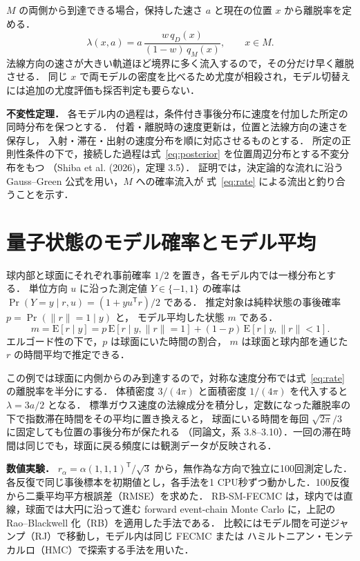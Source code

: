\documentclass[leqno,a4j]{jarticle}
\numberwithin{equation}{section}
\begin{document}
$M$ の両側から到達できる場合，保持した速さ $a$ と現在の位置 $x$ から離脱率を定める．
\begin{equation}
 \lambda(x,a)=a\,\frac{w\,q_D(x)}{(1-w)\,q_M(x)},\qquad x\in M .
 \label{eq:rate}
\end{equation}
法線方向の速さが大きい軌道ほど境界に多く流入するので，その分だけ早く離脱させる．
同じ $x$ で両モデルの密度を比べるため尤度が相殺され，モデル切替えには追加の尤度評価も採否判定も要らない．

\textbf{不変性定理．}
各モデル内の過程は，条件付き事後分布に速度を付加した所定の同時分布を保つとする．
付着・離脱時の速度更新は，位置と法線方向の速さを保存し，
入射・滞在・出射の速度分布を順に対応させるものとする．
所定の正則性条件の下で，接続した過程は式~\eqref{eq:posterior} を位置周辺分布とする不変分布をもつ
（Shiba et al. (2026)，定理 3.5）．
証明では，決定論的な流れに沿う Gauss--Green 公式を用い，$M$ への確率流入が
式~\eqref{eq:rate} による流出と釣り合うことを示す．

\newpage
\section{量子状態のモデル確率とモデル平均}
球内部と球面にそれぞれ事前確率 $1/2$ を置き，各モデル内では一様分布とする．
単位方向 $u$ に沿った測定値 $Y\in\{-1,1\}$ の確率は
$\Pr(Y=y\mid r,u)=(1+yu^{\mathsf T}r)/2$ である．
推定対象は純粋状態の事後確率 $p=\Pr(\|r\|=1\mid y)$ と，
モデル平均した状態 $m$ である．
\begin{equation}
 m=\mathrm{E}[r\mid y]
   =p\,\mathrm{E}[r\mid y,\|r\|=1]
   +(1-p)\,\mathrm{E}[r\mid y,\|r\|<1] .
 \label{eq:bma}
\end{equation}
エルゴード性の下で，$p$ は球面にいた時間の割合，
$m$ は球面と球内部を通じた $r$ の時間平均で推定できる．

この例では球面に内側からのみ到達するので，対称な速度分布では式~\eqref{eq:rate} の離脱率を半分にする．
体積密度 $3/(4\pi)$ と面積密度 $1/(4\pi)$ を代入すると $\lambda=3a/2$ となる．
標準ガウス速度の法線成分を積分し，定数になった離脱率の下で指数滞在時間をその平均に置き換えると，
球面にいる時間を毎回 $\sqrt{2\pi}/3$ に固定しても位置の事後分布が保たれる
（同論文，系 3.8--3.10）．一回の滞在時間は同じでも，球面に戻る頻度には観測データが反映される．

\textbf{数値実験．}
$r_\alpha=\alpha(1,1,1)^{\mathsf T}/\sqrt 3$ から，無作為な方向で独立に100回測定した．
各反復で同じ事後標本を初期値とし，各手法を1 CPU秒ずつ動かした．100反復から二乗平均平方根誤差（RMSE）を求めた．
RB-SM-FECMC は，球内では直線，球面では大円に沿って進む forward event-chain Monte Carlo に，上記の Rao--Blackwell 化（RB）を適用した手法である．
比較にはモデル間を可逆ジャンプ（RJ）で移動し，モデル内は同じ FECMC または
ハミルトニアン・モンテカルロ（HMC）で探索する手法を用いた．
\end{document}
